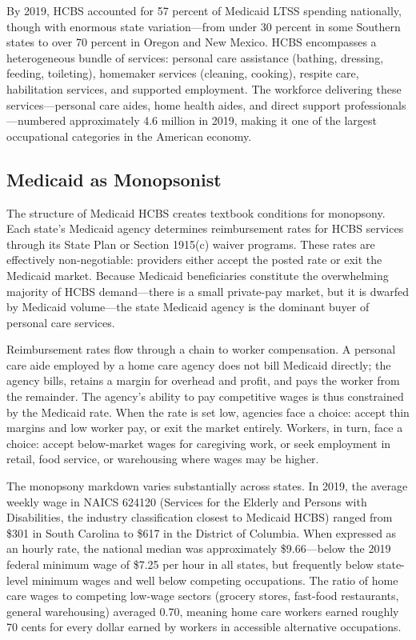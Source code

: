 \documentclass[12pt]{article}
\begin{document}
By 2019, HCBS accounted for 57 percent of Medicaid LTSS spending nationally, though with enormous state variation---from under 30 percent in some Southern states to over 70 percent in Oregon and New Mexico. HCBS encompasses a heterogeneous bundle of services: personal care assistance (bathing, dressing, feeding, toileting), homemaker services (cleaning, cooking), respite care, habilitation services, and supported employment. The workforce delivering these services---personal care aides, home health aides, and direct support professionals---numbered approximately 4.6 million in 2019, making it one of the largest occupational categories in the American economy.

\subsection{Medicaid as Monopsonist}

The structure of Medicaid HCBS creates textbook conditions for monopsony. Each state's Medicaid agency determines reimbursement rates for HCBS services through its State Plan or Section 1915(c) waiver programs. These rates are effectively non-negotiable: providers either accept the posted rate or exit the Medicaid market. Because Medicaid beneficiaries constitute the overwhelming majority of HCBS demand---there is a small private-pay market, but it is dwarfed by Medicaid volume---the state Medicaid agency is the dominant buyer of personal care services.

Reimbursement rates flow through a chain to worker compensation. A personal care aide employed by a home care agency does not bill Medicaid directly; the agency bills, retains a margin for overhead and profit, and pays the worker from the remainder. The agency's ability to pay competitive wages is thus constrained by the Medicaid rate. When the rate is set low, agencies face a choice: accept thin margins and low worker pay, or exit the market entirely. Workers, in turn, face a choice: accept below-market wages for caregiving work, or seek employment in retail, food service, or warehousing where wages may be higher.

The monopsony markdown varies substantially across states. In 2019, the average weekly wage in NAICS 624120 (Services for the Elderly and Persons with Disabilities, the industry classification closest to Medicaid HCBS) ranged from \$301 in South Carolina to \$617 in the District of Columbia. When expressed as an hourly rate, the national median was approximately \$9.66---below the 2019 federal minimum wage of \$7.25 per hour in all states, but frequently below state-level minimum wages and well below competing occupations. The ratio of home care wages to competing low-wage sectors (grocery stores, fast-food restaurants, general warehousing) averaged 0.70, meaning home care workers earned roughly 70 cents for every dollar earned by workers in accessible alternative occupations.
\end{document}
